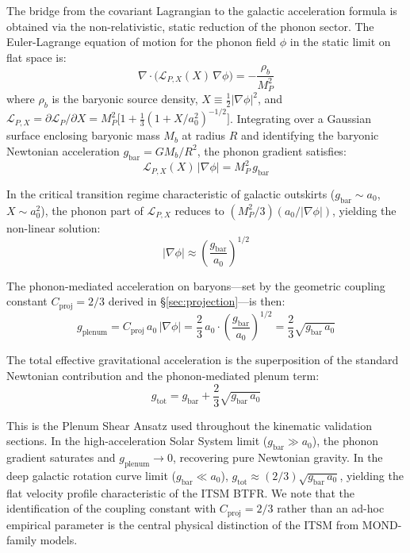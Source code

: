 \documentclass[aps,prd,10pt,onecolumn,superscriptaddress,nofootinbib]{revtex4-2}
\begin{document}
The bridge from the covariant Lagrangian to the galactic acceleration formula is obtained via the non-relativistic, static reduction of the phonon sector. The Euler-Lagrange equation of motion for the phonon field $\phi$ in the static limit on flat space is:
\begin{equation}
\nabla \cdot \bigl( \mathcal{L}_{P,X}(X)\, \nabla\phi \bigr) = -\frac{\rho_b}{M_P^2}
\end{equation}
where $\rho_b$ is the baryonic source density, $X \equiv \frac{1}{2}|\nabla\phi|^2$, and $\mathcal{L}_{P,X} = \partial\mathcal{L}_P/\partial X = M_P^2\bigl[1 + \frac{1}{3}(1+X/a_0^2)^{-1/2}\bigr]$. Integrating over a Gaussian surface enclosing baryonic mass $M_b$ at radius $R$ and identifying the baryonic Newtonian acceleration $g_{\text{bar}} = GM_b/R^2$, the phonon gradient satisfies:
\begin{equation}
\mathcal{L}_{P,X}(X)\,|\nabla\phi| = M_P^2\, g_{\text{bar}}
\end{equation}

In the critical transition regime characteristic of galactic outskirts ($g_{\text{bar}} \sim a_0$, $X \sim a_0^2$), the phonon part of $\mathcal{L}_{P,X}$ reduces to $(M_P^2/3)(a_0/|\nabla\phi|)$, yielding the non-linear solution:
\begin{equation}
|\nabla\phi| \approx \left(\frac{g_{\text{bar}}}{a_0}\right)^{1/2}
\end{equation}

The phonon-mediated acceleration on baryons---set by the geometric coupling constant $C_{\text{proj}} = 2/3$ derived in \S\ref{sec:projection}---is then:
\begin{equation}
g_{\text{plenum}} = C_{\text{proj}}\,a_0\,|\nabla\phi| = \frac{2}{3}\,a_0 \cdot \left(\frac{g_{\text{bar}}}{a_0}\right)^{1/2} = \frac{2}{3}\sqrt{g_{\text{bar}}\,a_0}
\end{equation}

The total effective gravitational acceleration is the superposition of the standard Newtonian contribution and the phonon-mediated plenum term:
\begin{equation}
g_{\text{tot}} = g_{\text{bar}} + \frac{2}{3}\sqrt{g_{\text{bar}}\,a_0}
\end{equation}

This is the Plenum Shear Ansatz used throughout the kinematic validation sections. In the high-acceleration Solar System limit ($g_{\text{bar}} \gg a_0$), the phonon gradient saturates and $g_{\text{plenum}} \to 0$, recovering pure Newtonian gravity. In the deep galactic rotation curve limit ($g_{\text{bar}} \ll a_0$), $g_{\text{tot}} \approx (2/3)\sqrt{g_{\text{bar}}\,a_0}$, yielding the flat velocity profile characteristic of the ITSM BTFR. We note that the identification of the coupling constant with $C_{\text{proj}} = 2/3$ rather than an ad-hoc empirical parameter is the central physical distinction of the ITSM from MOND-family models. 
\end{document}
